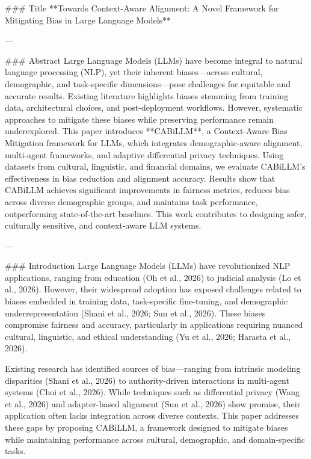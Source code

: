 ### Title  
**Towards Context-Aware Alignment: A Novel Framework for Mitigating Bias in Large Language Models**

---

### Abstract  
Large Language Models (LLMs) have become integral to natural language processing (NLP), yet their inherent biases—across cultural, demographic, and task-specific dimensions—pose challenges for equitable and accurate results. Existing literature highlights biases stemming from training data, architectural choices, and post-deployment workflows. However, systematic approaches to mitigate these biases while preserving performance remain underexplored. This paper introduces **CABiLLM**, a Context-Aware Bias Mitigation framework for LLMs, which integrates demographic-aware alignment, multi-agent frameworks, and adaptive differential privacy techniques. Using datasets from cultural, linguistic, and financial domains, we evaluate CABiLLM's effectiveness in bias reduction and alignment accuracy. Results show that CABiLLM achieves significant improvements in fairness metrics, reduces bias across diverse demographic groups, and maintains task performance, outperforming state-of-the-art baselines. This work contributes to designing safer, culturally sensitive, and context-aware LLM systems.

---

### Introduction  
Large Language Models (LLMs) have revolutionized NLP applications, ranging from education (Oh et al., 2026) to judicial analysis (Lo et al., 2026). However, their widespread adoption has exposed challenges related to biases embedded in training data, task-specific fine-tuning, and demographic underrepresentation (Shani et al., 2026; Sun et al., 2026). These biases compromise fairness and accuracy, particularly in applications requiring nuanced cultural, linguistic, and ethical understanding (Yu et al., 2026; Harasta et al., 2026).

Existing research has identified sources of bias—ranging from intrinsic modeling disparities (Shani et al., 2026) to authority-driven interactions in multi-agent systems (Choi et al., 2026). While techniques such as differential privacy (Wang et al., 2026) and adapter-based alignment (Sun et al., 2026) show promise, their application often lacks integration across diverse contexts. This paper addresses these gaps by proposing CABiLLM, a framework designed to mitigate biases while maintaining performance across cultural, demographic, and domain-specific tasks.

